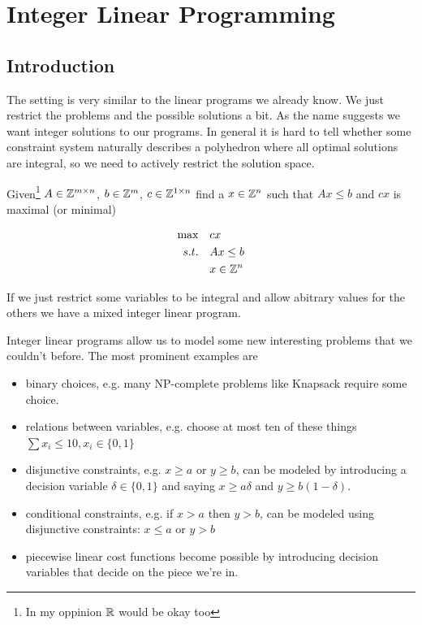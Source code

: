 \chapter{Integer Linear Programming}
\section{Introduction}

The setting is very similar to the linear programs we already know. We just restrict the problems and the possible solutions a bit. As the name suggests we want integer solutions to our programs. In general it is hard to tell whether some constraint system naturally describes a polyhedron where all optimal solutions are integral, so we need to actively restrict the solution space. 

\begin{Def} Given\footnote{In my oppinion $\mathbb{R}$ would be okay too} $A\in \mathbb{Z}^{m\times n}$, $b\in \mathbb{Z}^m$, $c\in \mathbb{Z}^{1\times n}$ find a $x\in \mathbb{Z}^n$ such that $Ax\leq b$ and $cx$ is maximal (or minimal)

\begin{align*}
\max \quad & cx \\
s.t. \quad & Ax \leq b\\
&x\in \mathbb{Z}^n
\end{align*}
\end{Def}

If we just restrict some variables to be integral and allow abitrary values for the others we have a mixed integer linear program.

Integer linear programs allow us to model some new interesting problems that we couldn't before. The most prominent examples are 

\begin{itemize}
\item binary choices, e.g. many NP-complete problems like Knapsack require some choice. 
\item relations between variables, e.g. choose at most ten of these things $\sum x_i \leq 10, x_i\in \{0,1\}$
\item disjunctive constraints, e.g. $x\geq a$ or $y\geq b$, can be modeled by introducing a decision variable $\delta \in \{0,1\}$ and saying $x\geq a\delta$ and $y \geq b(1-\delta)$. 
\item conditional constraints, e.g. if $x>a$ then $y>b$, can be modeled using disjunctive constraints: $x\leq a$ or $y>b$
\item piecewise linear cost functions become possible by introducing decision variables that decide on the piece we're in.
\end{itemize}

